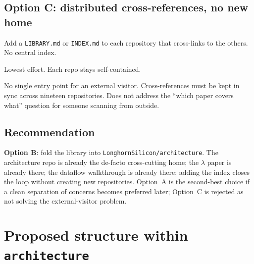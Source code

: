 \documentclass[11pt]{article}
\begin{document}
\subsection{Option C: distributed cross-references, no new home}

Add a \texttt{LIBRARY.md} or \texttt{INDEX.md} to each repository
that cross-links to the others. No central index.

\begin{description}[leftmargin=2em,style=nextline]
\item[Pros]
Lowest effort. Each repo stays self-contained.
\item[Cons]
No single entry point for an external visitor. Cross-references must
be kept in sync across nineteen repositories. Does not address the
``which paper covers what'' question for someone scanning from outside.
\end{description}

\subsection{Recommendation}

\textbf{Option B}: fold the library into
\texttt{LonghornSilicon/architecture}. The architecture repo is
already the de-facto cross-cutting home; the $\lambda$ paper is
already there; the dataflow walkthrough is already there; adding the
index closes the loop without creating new repositories. Option~A
is the second-best choice if a clean separation of concerns
becomes preferred later; Option~C is rejected as not solving the
external-visitor problem.

\section{Proposed structure within \texttt{architecture}}
\end{document}
